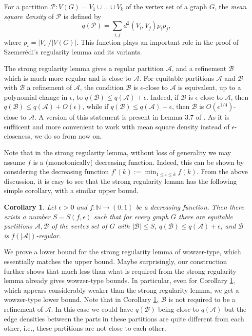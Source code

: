 \documentclass[11pt]{article}
\newtheorem{corollary}{Corollary}[section]
\begin{document}
For a partition $\mathcal{P}:V(G)=V_1 \cup \ldots \cup V_k$ of the vertex set
of a graph $G$, the {\it mean square density} of $\mathcal{P}$ is defined by
$$q(\mathcal{P})=\sum_{i,j}d^2(V_i,V_j)p_ip_j,$$ where $p_i=|V_i|/|V(G)|$. This
function plays an important role in the proof of Szemer\'edi's regularity lemma
and its variants.

The strong regularity lemma gives a regular partition $\mathcal{A}$, and a
refinement $\mathcal{B}$ which is much more regular and is close to
$\mathcal{A}$. For equitable partitions $\mathcal{A}$ and $\mathcal{B}$ with
$\mathcal{B}$ a refinement of $\mathcal{A}$, the condition $\mathcal{B}$ is
$\epsilon$-close to $\mathcal{A}$ is equivalent,  up to a polynomial change in
$\epsilon$, to $q(\mathcal{B}) \leq q(\mathcal{A})+\epsilon$. Indeed, if $\mathcal{B}$ is $\epsilon$-close to $\mathcal{A}$, then $q(\mathcal{B}) \leq q(\mathcal{A}) + O(\epsilon)$, while if $q(\mathcal{B}) \leq q(\mathcal{A})+\epsilon$, then $\mathcal{B}$ is $O(\epsilon^{1/4})$-close to $\mathcal{A}$. A version of this statement is present in Lemma 3.7 of \cite{AFKS}. As it is suffiicent and more convenient to work with mean square density instead of $\epsilon$-closeness, we do so from now on. 

Note that in the strong regularity lemma, without loss of generality we may
assume $f$ is a (monotonically) decreasing function. Indeed, this can be shown
by considering the decreasing function $f'(k):=\min_{1 \leq i \leq k} f(k)$.
From the above discussion, it is easy to see that the strong regularity lemma
has the following simple corollary, with a similar upper bound.

\begin{corollary} \label{strongcor}
Let $\epsilon>0$ and $f:\mathbb{N} \rightarrow (0,1)$ be a decreasing function.
Then there exists a number $S=S(f,\epsilon)$ such that for every graph $G$
there are equitable partitions $\mathcal{A},\mathcal{B}$ of the vertex set of
$G$ with $|\mathcal{B}| \leq S$, $q(\mathcal{B}) \leq q(\mathcal{A})+\epsilon$,
and $\mathcal{B}$ is $f(|\mathcal{A}|)$-regular.
\end{corollary}

We prove a lower bound for the strong regularity lemma of wowzer-type, which
essentially matches the upper bound. Maybe surprisingly, our construction
further shows that much less than what is required from the strong regularity
lemma already gives wowzer-type bounds. In particular, even for Corollary
\ref{strongcor}, which appears considerably weaker than the strong regularity
lemma, we get a wowzer-type lower bound. Note that in Corollary
\ref{strongcor}, $\mathcal{B}$ is not required to be a refinement of
$\mathcal{A}$. In this case we could have $q(\mathcal{B})$ being close to
$q(\mathcal{A})$ but the edge densities between the parts in these partitions
are quite different from each other, i.e., these partitions are not close to
each other.
\end{document}
